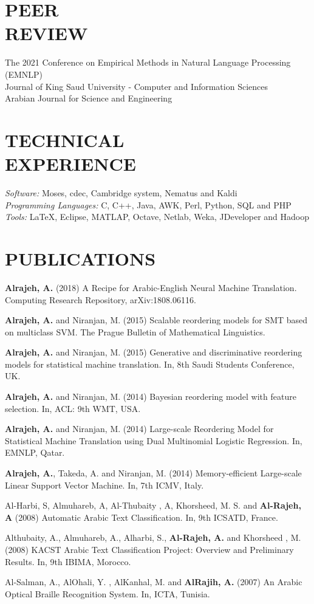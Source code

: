 \documentclass[margin,a4paper]{res}
\begin{document}
\begin{resume}
\section{PEER\\REVIEW}  The 2021 Conference on Empirical Methods in Natural Language Processing (EMNLP)\\
		 	Journal of King Saud University - Computer and Information Sciences\\
			Arabian Journal for Science and Engineering
\section{TECHNICAL\\EXPERIENCE} {\sl Software:} Moses, cdec, Cambridge system, Nematus and Kaldi\\
				{\sl Programming Languages:} C, C++, Java, AWK, Perl, Python, SQL and PHP\\
				{\sl Tools:} LaTeX, Eclipse, MATLAP, Octave, Netlab, Weka, JDeveloper and Hadoop

\section{PUBLICATIONS}
{\bf Alrajeh, A.} (2018) A Recipe for Arabic-English Neural Machine Translation. Computing Research Repository, arXiv:1808.06116.

{\bf Alrajeh, A.} and Niranjan, M. (2015) Scalable reordering models for SMT based on multiclass SVM. The Prague Bulletin of Mathematical Linguistics.

{\bf Alrajeh, A.} and Niranjan, M. (2015) Generative and discriminative reordering models for statistical machine translation. In, 8th Saudi Students Conference, UK.

{\bf Alrajeh, A.} and Niranjan, M. (2014) Bayesian reordering model with feature selection. In, ACL: 9th WMT, USA.

{\bf Alrajeh, A.} and Niranjan, M. (2014) Large-scale Reordering Model for Statistical Machine Translation using Dual Multinomial Logistic Regression. In, EMNLP, Qatar.

{\bf Alrajeh, A.}, Takeda, A. and Niranjan, M. (2014) Memory-eﬃcient Large-scale Linear Support Vector Machine. In, 7th ICMV, Italy.

Al-Harbi, S, Almuhareb, A, Al-Thubaity , A, Khorsheed, M. S. and {\bf Al-Rajeh, A} (2008) Automatic Arabic Text Classification. In, 9th ICSATD, France.

Althubaity, A., Almuhareb, A., Alharbi, S., {\bf Al-Rajeh, A.} and Khorsheed , M. (2008) KACST Arabic Text Classification Project: Overview and Preliminary Results. In, 9th IBIMA, Morocco.

Al-Salman, A., AlOhali, Y. , AlKanhal, M. and {\bf AlRajih, A.} (2007) An Arabic Optical Braille Recognition System. In, ICTA, Tunisia.

\end{resume}
\end{document}

